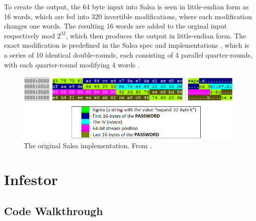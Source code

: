 \documentclass[twocolumn]{article}
\begin{document}
To create the output, the 64 byte input into Salsa is seen in little-endian form as 16 words, which are fed into 320 invertible modifications, where each modification changes one words. The resulting 16 words are added to the orginal input respectively mod $2^32$, which then produces the output in little-endian form. The exact modification is predefined in the Salsa spec and implementations \cite{salsa20}, which is a series of 10 identical double-rounds, each consisting of 4 parallel quarter-rounds, with each quarter-round modifying 4 words \cite{salsa20Core}. 


\begin{figure}
	\includegraphics[width = \textwidth]{salsaChart.png}
	\caption{The original Salsa implementation. From \cite{decryptPetya}.}
	\label{fig:salsaChart}
\end{figure}

\section{Infestor}
\label{sec:infestor}
\subsection{Code Walkthrough}

 
\end{document}
